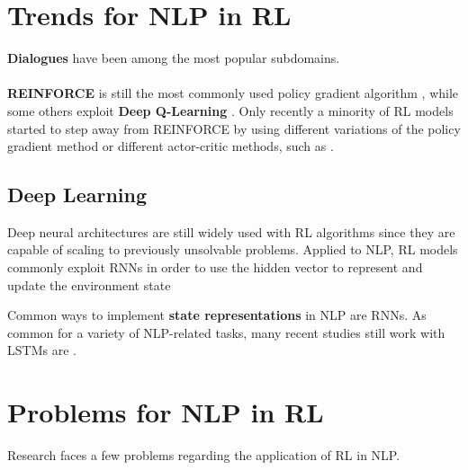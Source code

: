 \documentclass[11pt,a4paper]{article}
\begin{document}
\section{Trends for NLP in RL}
\textbf{Dialogues} have been among the most popular subdomains.\\\\ 
\textbf{REINFORCE} is still the most commonly used policy gradient algorithm \citep{yasui-etal-2019, zhang-2018, hu-etal-2018-playing, godin-etal-2019-learning, huang-etal-2018-neural, mao-etal-2018-end, ranzato2015sequence, wu-etal-2018-study, clark-manning-2016-deep,yogatama-2017, guu-etal-2017-language, zeng-2018}, while some others exploit \textbf{Deep Q-Learning} \citet{narasimhan-etal-2016-improving, mosallanezhad-etal-2019-deep, ling-etal-2017-learning}. Only recently a minority of RL models started to step away from REINFORCE by using different variations of the policy gradient method \citet{branavan-2009, li-etal-2018-paraphrase, li-etal-2016-deep, le-fokkens-2017-tackling} or different actor-critic methods, such as \citet{dethlefs-cuayahuitl-2011,grissom-ii-etal-2014-dont, he-etal-2016-deep-reinforcement, chen-bansal-2018-fast, goyal-2019}. 

\subsection{Deep Learning}
Deep neural architectures are still widely used with RL algorithms since they are capable of scaling to previously unsolvable problems. Applied to NLP, RL models commonly exploit RNNs in order to use the hidden vector to represent and update the environment state


Common ways to implement \textbf{state representations} in NLP are RNNs. As common for a variety of NLP-related tasks, many recent studies still work with LSTMs are \citet{yasui-etal-2019, zhang-2018, li-etal-2016-deep, ranzato2015sequence}. 

\section{Problems for NLP in RL}
Research faces a few problems regarding the application of RL in NLP. 
\end{document}
